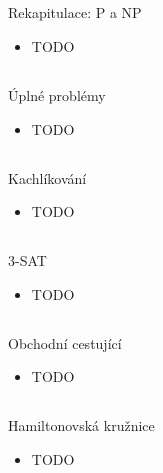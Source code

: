 \documentclass{beamer}
\begin{document}
\subsection{}
\begin{frame}{Rekapitulace: P a NP}
\begin{itemize}
\item TODO
\end{itemize}
\end{frame}

\subsection{}
\begin{frame}{Úplné problémy}
\begin{itemize}
\item TODO
\end{itemize}
\end{frame}

\subsection{}
\begin{frame}{Kachlíkování}
\begin{itemize}
\item TODO
\end{itemize}
\end{frame}

\subsection{}
\begin{frame}{3-SAT}
\begin{itemize}
\item TODO
\end{itemize}
\end{frame}

\subsection{}
\begin{frame}{Obchodní cestující}
\begin{itemize}
\item TODO
\end{itemize}
\end{frame}

\subsection{}
\begin{frame}{Hamiltonovská kružnice}
\begin{itemize}
\item TODO
\end{itemize}
\end{frame}
\end{document}
